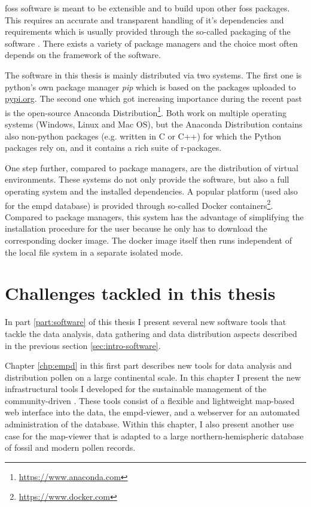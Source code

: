 \begin{refsection}
\gls{foss} software is meant to be extensible and to build upon other \gls{foss} packages. This requires an accurate and transparent handling of it's dependencies and requirements which is usually provided through the so-called packaging of the software \citep[e.g.][]{Torborg2016}. There exists a variety of package managers and the choice most often depends on the framework of the software.

The software in this thesis is mainly distributed via two systems. The first one is python's own package manager \textit{pip} which is based on the packages uploaded to \href{https://pypi.org/}{pypi.org}. The second one which got increasing importance during the recent past is the open-source Anaconda Distribution\footnote{\url{https://www.anaconda.com}}. Both work on multiple operating systems (Windows, Linux and Mac OS), but the Anaconda Distribution contains also non-python packages (e.g. written in C or C++) for which the Python packages rely on, and it contains a rich suite of r-packages.

One step further, compared to package managers, are the distribution of virtual environments. These systems do not only provide the software, but also a full operating system and the installed dependencies. A popular platform (used also for the \gls{empd} database) is provided through so-called Docker containers\footnote{\url{https://www.docker.com}}. Compared to package managers, this system has the advantage of simplifying the installation procedure for the user because he only has to download the corresponding docker image. The docker image itself then runs independent of the local file system in a separate isolated mode.



\section{Challenges tackled in this thesis} \label{sec:intro-thesis-overview}

In part \ref{part:software} of this thesis I present several new software tools that tackle the data analysis, data gathering and data distribution aspects described in the previous section \ref{sec:intro-software}. 

Chapter \ref{chp:empd} in this first part describes new tools for data analysis and distribution pollen on a large continental scale. In this chapter I present the new infrastructural tools I developed for the sustainable management of the community-driven . These tools consist of a flexible and lightweight map-based web interface into the data, the \acrshort{empd}-viewer, and a webserver for an automated administration of the database. Within this chapter, I also present another use case for the map-viewer that is adapted to a large northern-hemispheric database of fossil and modern pollen records.


\end{refsection}
